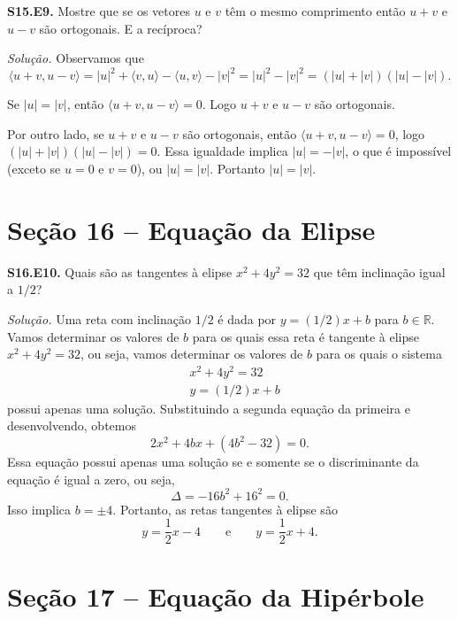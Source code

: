 \documentclass[a4paper,11pt]{article}
\newcommand{\R}{\mathbb{R}}
\begin{document}
\vspace{\baselineskip}

\textbf{S15.E9.}
Mostre que se os vetores $u$ e $v$ têm o mesmo comprimento então $u + v$ e $u - v$ são ortogonais.
E a recíproca?

\vspace{\baselineskip}

\emph{Solução.}
Observamos que
\[
  \langle u + v, u - v \rangle = |u|^2 + \langle v, u \rangle - \langle u, v \rangle - |v|^2 = |u|^2 - |v|^2 = (|u| + |v|)(|u| - |v|).
\]

Se $|u| = |v|$, então $\langle u + v, u - v \rangle = 0$.
Logo $u + v$ e $u - v$ são ortogonais.

Por outro lado, se $u + v$ e $u - v$ são ortogonais, então $\langle u + v, u - v \rangle = 0$, logo $(|u|+|v|)(|u|-|v|) = 0$.
Essa igualdade implica $|u| = -|v|$, o que é impossível (exceto se $u = 0$ e $v = 0$), ou $|u| = |v|$.
Portanto $|u| = |v|$.

\section*{Seção 16 -- Equação da Elipse}

\textbf{S16.E10.}
Quais são as tangentes à elipse $x^2 + 4y^2 = 32$ que têm inclinação igual a $1/2$?

\vspace{\baselineskip}

\emph{Solução.}
Uma reta com inclinação $1/2$ é dada por $y = (1/2)x + b$ para $b \in \R$.
Vamos determinar os valores de $b$ para os quais essa reta é tangente à elipse $x^2 + 4y^2 = 32$, ou seja, vamos determinar os valores de $b$ para os quais o sistema
\begin{align*}
  & x^2 + 4y^2 = 32 \\
  & y = (1/2)x + b
\end{align*}
possui apenas uma solução.
Substituindo a segunda equação da primeira e desenvolvendo, obtemos
\[
  2x^2 + 4bx + (4b^2 - 32) = 0.
\]
Essa equação possui apenas uma solução se e somente se o discriminante da equação é igual a zero, ou seja,
\[
  \Delta = -16b^2 + 16^2 = 0.
\]
Isso implica $b = \pm 4$.
Portanto, as retas tangentes à elipse são
\[
  y = \frac{1}{2} x - 4 \qquad \text{e} \qquad y = \frac{1}{2} x + 4.
\]

\section*{Seção 17 -- Equação da Hipérbole}
\end{document}
